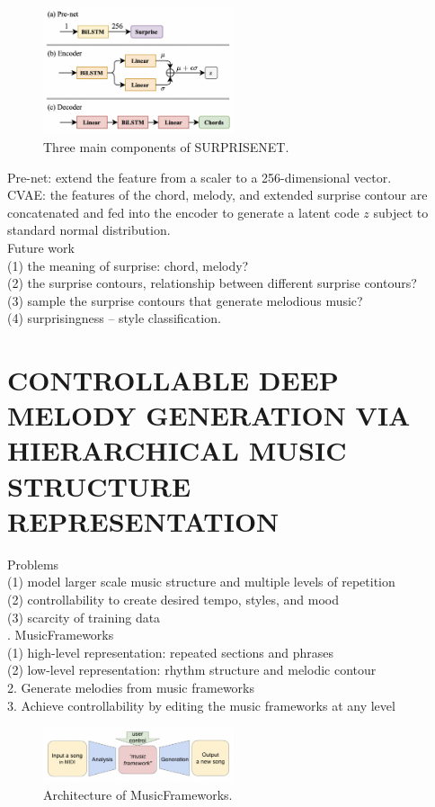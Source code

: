 \documentclass{article}
\begin{document}
\noindent
\begin{figure}[H]
	\centerline{
   \includegraphics[width=0.5\textwidth]{Fig2.png}}
   \caption{Three main components of SURPRISENET.}
   \label{fig:example}
\end{figure}

\noindent
Pre-net: extend the feature from a scaler to a 256-dimensional vector.\\
CVAE: the features of the chord, melody, and extended surprise contour are concatenated and fed into the encoder to generate a latent code $z$ subject to standard normal distribution.\\

\noindent
Future work\\
(1) the meaning of surprise: chord, melody?\\
(2) the surprise contours, relationship between different surprise contours?\\
(3) sample the surprise contours that generate melodious music?\\
(4) surprisingness -- style classification.\\

\section{CONTROLLABLE DEEP MELODY GENERATION VIA HIERARCHICAL MUSIC STRUCTURE REPRESENTATION}
Problems\\
(1) model larger scale music structure and multiple levels of repetition\\
(2) controllability to create desired tempo, styles, and mood\\
(3) scarcity of training data\\

. MusicFrameworks\\
(1) high-level representation: repeated sections and phrases\\
(2) low-level representation: rhythm structure and melodic contour\\
2. Generate melodies from music frameworks\\
3. Achieve controllability by editing the music frameworks at any level
\begin{figure}[H]
	\centerline{
   \includegraphics[width=0.5\textwidth]{Fig3.png}}
   \caption{Architecture of MusicFrameworks.}
   \label{fig:example}
\end{figure}
\end{document}
